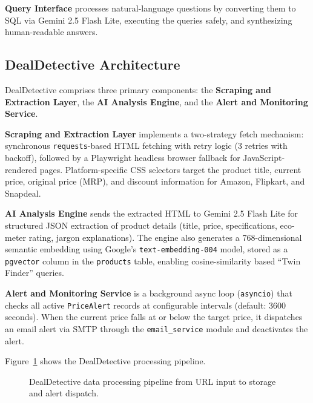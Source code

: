 \documentclass[]{IEEEtran}
\begin{document}
\textbf{Query Interface} processes natural-language questions by converting them to SQL via Gemini 2.5 Flash Lite, executing the queries safely, and synthesizing human-readable answers.

\subsection{DealDetective Architecture}

DealDetective comprises three primary components: the \textbf{Scraping and Extraction Layer}, the \textbf{AI Analysis Engine}, and the \textbf{Alert and Monitoring Service}.

\textbf{Scraping and Extraction Layer} implements a two-strategy fetch mechanism: synchronous \texttt{requests}-based HTML fetching with retry logic (3 retries with backoff), followed by a Playwright headless browser fallback for JavaScript-rendered pages. Platform-specific CSS selectors target the product title, current price, original price (MRP), and discount information for Amazon, Flipkart, and Snapdeal.

\textbf{AI Analysis Engine} sends the extracted HTML to Gemini 2.5 Flash Lite for structured JSON extraction of product details (title, price, specifications, eco-meter rating, jargon explanations). The engine also generates a 768-dimensional semantic embedding using Google's \texttt{text-embedding-004} model, stored as a \texttt{pgvector} column in the \texttt{products} table, enabling cosine-similarity based ``Twin Finder'' queries.

\textbf{Alert and Monitoring Service} is a background async loop (\texttt{asyncio}) that checks all active \texttt{PriceAlert} records at configurable intervals (default: 3600 seconds). When the current price falls at or below the target price, it dispatches an email alert via SMTP through the \texttt{email\_service} module and deactivates the alert.

Figure~\ref{fig:dd_pipeline} shows the DealDetective processing pipeline.

\begin{figure}[H]
    \centering
    \caption{DealDetective data processing pipeline from URL input to storage and alert dispatch.}
    \label{fig:dd_pipeline}
\end{figure}
\end{document}
